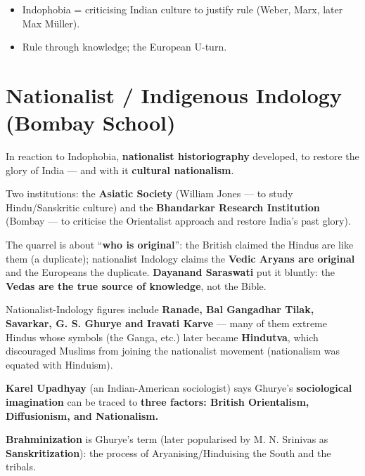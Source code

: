 \begin{QuickRevision}
\begin{itemize}
\item Indophobia = criticising Indian culture to justify rule (Weber, Marx, later Max M\"uller).
\item Rule through knowledge; the European U-turn.
\end{itemize}
\end{QuickRevision}

\section{Nationalist / Indigenous Indology (Bombay School)}

In reaction to Indophobia, \textbf{nationalist historiography} developed, to restore the glory of India --- and with it \textbf{cultural nationalism}.

Two institutions: the \textbf{Asiatic Society} (William Jones --- to study Hindu/Sanskritic culture) and the \textbf{Bhandarkar Research Institution} (Bombay --- to criticise the Orientalist approach and restore India's past glory).

\begin{ExampleBox}
The quarrel is about ``\textbf{who is original}'': the British claimed the Hindus are like them (a duplicate); nationalist Indology claims the \textbf{Vedic Aryans are original} and the Europeans the duplicate. \textbf{Dayanand Saraswati} put it bluntly: the \textbf{Vedas are the true source of knowledge}, not the Bible.
\end{ExampleBox}

Nationalist-Indology figures include \textbf{Ranade, Bal Gangadhar Tilak, Savarkar, G. S. Ghurye and Iravati Karve} --- many of them extreme Hindus whose symbols (the Ganga, etc.) later became \textbf{Hindutva}, which discouraged Muslims from joining the nationalist movement (nationalism was equated with Hinduism).

\begin{KeyConcept}
\textbf{Karel Upadhyay} (an Indian-American sociologist) says Ghurye's \textbf{sociological imagination} can be traced to \textbf{three factors: British Orientalism, Diffusionism, and Nationalism.}
\end{KeyConcept}

\begin{KeyConcept}
\textbf{Brahminization} is Ghurye's term (later popularised by M. N. Srinivas as \textbf{Sanskritization}): the process of Aryanising/Hinduising the South and the tribals.
\end{KeyConcept}

